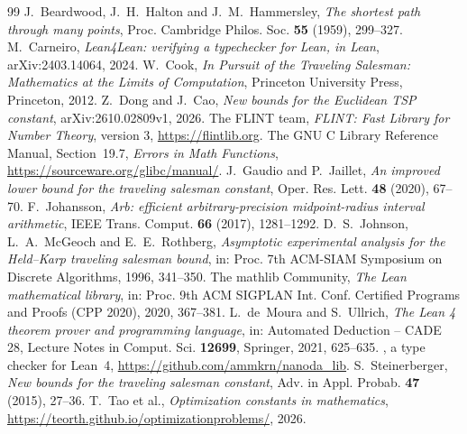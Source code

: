 \documentclass[11pt]{amsart}
\theoremstyle{definition}
\theoremstyle{remark}
\numberwithin{equation}{section}
\newcommand{\lean}[1]{\texttt{\detokenize{#1}}}
\begin{document}
\begin{thebibliography}{99}
 J.~Beardwood, J.~H.~Halton and J.~M.~Hammersley, \emph{The shortest path through many points}, Proc. Cambridge Philos. Soc. \textbf{55} (1959), 299--327.
 M.~Carneiro, \emph{Lean4Lean: verifying a typechecker for Lean, in Lean}, arXiv:2403.14064, 2024.
 W.~Cook, \emph{In Pursuit of the Traveling Salesman: Mathematics at the Limits of Computation}, Princeton University Press, Princeton, 2012.
 Z.~Dong and J.~Cao, \emph{New bounds for the Euclidean TSP constant}, arXiv:2610.02809v1, 2026.
 The FLINT team, \emph{FLINT: Fast Library for Number Theory}, version 3, \url{https://flintlib.org}.
 The GNU C Library Reference Manual, Section~19.7, \emph{Errors in Math Functions}, \url{https://sourceware.org/glibc/manual/}.
 J.~Gaudio and P.~Jaillet, \emph{An improved lower bound for the traveling salesman constant}, Oper. Res. Lett. \textbf{48} (2020), 67--70.
 F.~Johansson, \emph{Arb: efficient arbitrary-precision midpoint-radius interval arithmetic}, IEEE Trans. Comput. \textbf{66} (2017), 1281--1292.
 D.~S.~Johnson, L.~A.~McGeoch and E.~E.~Rothberg, \emph{Asymptotic experimental analysis for the Held--Karp traveling salesman bound}, in: Proc. 7th ACM-SIAM Symposium on Discrete Algorithms, 1996, 341--350.
 The mathlib Community, \emph{The Lean mathematical library}, in: Proc. 9th ACM SIGPLAN Int. Conf. Certified Programs and Proofs (CPP 2020), 2020, 367--381.
 L.~de~Moura and S.~Ullrich, \emph{The Lean 4 theorem prover and programming language}, in: Automated Deduction -- CADE 28, Lecture Notes in Comput. Sci. \textbf{12699}, Springer, 2021, 625--635.
 \lean{nanoda_lib}, a type checker for Lean~4, \url{https://github.com/ammkrn/nanoda_lib}.
 S.~Steinerberger, \emph{New bounds for the traveling salesman constant}, Adv. in Appl. Probab. \textbf{47} (2015), 27--36.
 T.~Tao et al., \emph{Optimization constants in mathematics}, \url{https://teorth.github.io/optimizationproblems/}, 2026.
\end{thebibliography}
\end{document}
